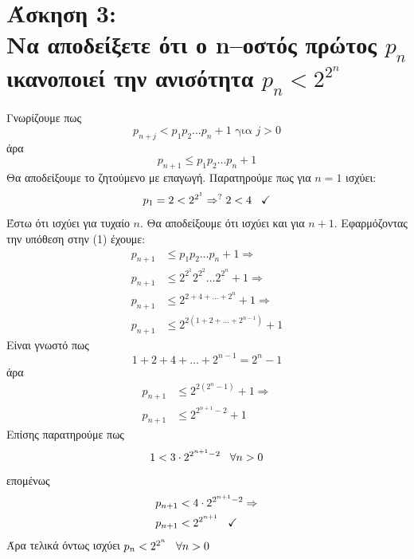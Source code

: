 \documentclass{article}
\newcommand{\blank}[1]{\hspace*{#1}}
\newcommand{\myspace}{\blank{0.3cm}}
\newcommand{\lt}[1]{\latintext #1\greektext}
\newcommand{\task}[2]{\newpage\section*{Άσκηση #1:\\#2}}
\begin{document}
\task{3}{
    Να αποδείξετε ότι ο \lt{n}--οστός πρώτος $p_n$ ικανοποιεί την ανισότητα
    $p_n < 2^{2^n}$
}
{
    Γνωρίζουμε πως 
    \[p_{n + j} < p_1p_2\ldots p_n + 1 \text{ για $j > 0$}\]
    άρα
    \begin{equation}
        p_{n + 1} \leq p_1p_2\ldots p_n + 1  
    \end{equation}
    Θα αποδείξουμε το ζητούμενο με επαγωγή. Παρατηρούμε πως για $n = 1$ ισχύει:
    \[p_1 = 2 < 2^{2^1} \Rightarrow^? 2 < 4 \myspace \checkmark\]
    Έστω ότι ισχύει για τυχαίο $n$. Θα αποδείξουμε ότι ισχύει και για $n + 1$. Εφαρμόζοντας την υπόθεση στην (1) έχουμε:
    \begin{align*}
        p_{n + 1} &\leq p_1p_2\ldots p_n + 1  \Rightarrow\\
        p_{n + 1} &\leq 2^{2^1}2^{2^2}\ldots2^{2^n} + 1 \Rightarrow\\
        p_{n + 1} &\leq 2^{2 + 4 + \ldots + 2^n} + 1 \Rightarrow\\
        p_{n + 1} &\leq 2^{2(1 + 2 + \ldots + 2^{n - 1})} + 1
    \end{align*}
    Είναι γνωστό πως
    \[1 + 2 + 4 + \ldots + 2^{n - 1} = 2^n - 1\]
    άρα
    \begin{align*}
        p_{n + 1} &\leq 2^{2(2^n - 1)} + 1 \Rightarrow\\
        p_{n + 1} &\leq 2^{2^{n + 1} - 2} + 1
    \end{align*}
    Επίσης παρατηρούμε πως
    \[1 < 3\cdot2^{2^{n + 1} - 2} \myspace \forall n > 0\]
    επομένως
    \begin{align*}
        p_{n + 1} &< 4\cdot2^{2^{n + 1} - 2} \Rightarrow\\
        p_{n + 1} &< 2^{2^{n + 1}} \myspace \checkmark
    \end{align*}
    Άρα τελικά όντως ισχύει $p_n < 2^{2^n} \myspace \forall n > 0$
}
\end{document}
